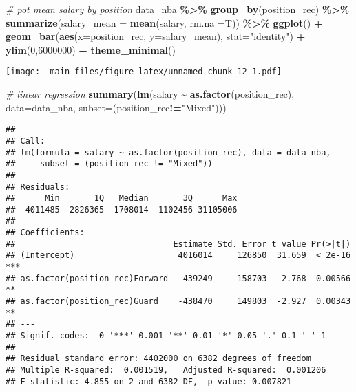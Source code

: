 \documentclass[
]{book}
\newenvironment{Shaded}{\begin{snugshade}}{\end{snugshade}}
\newcommand{\AttributeTok}[1]{\textcolor[rgb]{0.13,0.29,0.53}{#1}}
\newcommand{\CommentTok}[1]{\textcolor[rgb]{0.56,0.35,0.01}{\textit{#1}}}
\newcommand{\DecValTok}[1]{\textcolor[rgb]{0.00,0.00,0.81}{#1}}
\newcommand{\FunctionTok}[1]{\textcolor[rgb]{0.13,0.29,0.53}{\textbf{#1}}}
\newcommand{\NormalTok}[1]{#1}
\newcommand{\SpecialCharTok}[1]{\textcolor[rgb]{0.81,0.36,0.00}{\textbf{#1}}}
\newcommand{\StringTok}[1]{\textcolor[rgb]{0.31,0.60,0.02}{#1}}
\begin{document}
\begin{Shaded}
\begin{Highlighting}[]
\CommentTok{\# pot mean salary by position}
\NormalTok{data\_nba }\SpecialCharTok{\%\textgreater{}\%} \FunctionTok{group\_by}\NormalTok{(position\_rec) }\SpecialCharTok{\%\textgreater{}\%}
  \FunctionTok{summarize}\NormalTok{(}\AttributeTok{salary\_mean =} \FunctionTok{mean}\NormalTok{(salary, }\AttributeTok{rm.na =}\NormalTok{T)) }\SpecialCharTok{\%\textgreater{}\%}
  \FunctionTok{ggplot}\NormalTok{() }\SpecialCharTok{+}
  \FunctionTok{geom\_bar}\NormalTok{(}\FunctionTok{aes}\NormalTok{(}\AttributeTok{x=}\NormalTok{position\_rec, }\AttributeTok{y=}\NormalTok{salary\_mean), }\AttributeTok{stat=}\StringTok{"identity"}\NormalTok{) }\SpecialCharTok{+}
  \FunctionTok{ylim}\NormalTok{(}\DecValTok{0}\NormalTok{,}\DecValTok{6000000}\NormalTok{) }\SpecialCharTok{+}
  \FunctionTok{theme\_minimal}\NormalTok{()}
\end{Highlighting}
\end{Shaded}

\texttt{[image: \_main\_files/figure-latex/unnamed-chunk-12-1.pdf]}

\begin{Shaded}
\begin{Highlighting}[]
\CommentTok{\# linear regression}
\FunctionTok{summary}\NormalTok{(}\FunctionTok{lm}\NormalTok{(salary }\SpecialCharTok{\textasciitilde{}} \FunctionTok{as.factor}\NormalTok{(position\_rec), }\AttributeTok{data=}\NormalTok{data\_nba, }\AttributeTok{subset=}\NormalTok{(position\_rec}\SpecialCharTok{!=}\StringTok{"Mixed"}\NormalTok{)))}
\end{Highlighting}
\end{Shaded}

\begin{verbatim}
## 
## Call:
## lm(formula = salary ~ as.factor(position_rec), data = data_nba, 
##     subset = (position_rec != "Mixed"))
## 
## Residuals:
##      Min       1Q   Median       3Q      Max 
## -4011485 -2826365 -1708014  1102456 31105006 
## 
## Coefficients:
##                                Estimate Std. Error t value Pr(>|t|)    
## (Intercept)                     4016014     126850  31.659  < 2e-16 ***
## as.factor(position_rec)Forward  -439249     158703  -2.768  0.00566 ** 
## as.factor(position_rec)Guard    -438470     149803  -2.927  0.00343 ** 
## ---
## Signif. codes:  0 '***' 0.001 '**' 0.01 '*' 0.05 '.' 0.1 ' ' 1
## 
## Residual standard error: 4402000 on 6382 degrees of freedom
## Multiple R-squared:  0.001519,   Adjusted R-squared:  0.001206 
## F-statistic: 4.855 on 2 and 6382 DF,  p-value: 0.007821
\end{verbatim}
\end{document}
